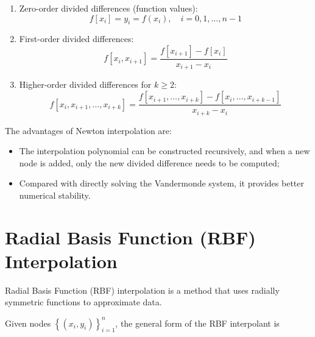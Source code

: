 \documentclass[12pt,a4paper]{report}
\begin{document}
            \begin{enumerate}
                \item Zero-order divided differences (function values):
                \begin{equation*}
                    f\left[x_{i}\right] = y_{i} = f\left(x_{i}\right), \quad i = 0, 1 , \dots, n-1
                \end{equation*}
                
                \item First-order divided differences:
                \begin{equation*}
                    f\left[x_{i}, x_{i+1}\right] = \frac{f\left[x_{i+1}\right] - f\left[x_{i}\right]}{x_{i+1} - x_{i}}
                \end{equation*}
                
                \item Higher-order divided differences for $k \ge 2$:
                \begin{equation*}
                    f\left[x_{i}, x_{i+1}, \dots, x_{i+k}\right] = \frac{f\left[x_{i+1}, \dots, x_{i+k}\right] - f\left[x_i, \dots, x_{i+k-1}\right]}{x_{i+k} - x_i}
                \end{equation*}
            \end{enumerate}

            The advantages of Newton interpolation are:

            \begin{itemize}
                \item The interpolation polynomial can be constructed recursively, and when a new node is added, only the new divided difference needs to be computed;
                \item Compared with directly solving the Vandermonde system, it provides better numerical stability.
            \end{itemize}

        \section{Radial Basis Function (RBF) Interpolation}\label{sec:rbf}
            Radial Basis Function (RBF) interpolation is a method that uses radially symmetric functions to approximate data.

            Given nodes $\left\{\left(x_{i}, y_{i}\right)\right\}_{i=1}^n$, the general form of the RBF interpolant is
\end{document}
